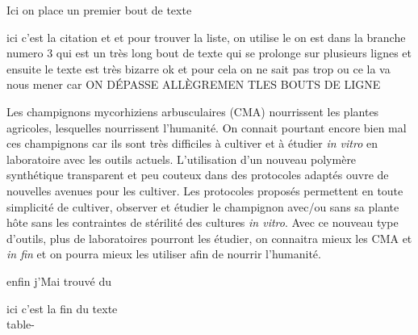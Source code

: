 \documentclass{sn-jnl}%
\begin{document}
	Ici on place un premier bout de texte

 ici c'est la citation \cite{declerck_vitro_2005}et
\cite{fortin_arbuscular_2002}et pour trouver la liste,
\cite{silvani_novel_2019}on utilise le on est dans la branche numero 3 qui est
un très long bout de texte qui se prolonge sur plusieurs lignes et ensuite le
texte est très bizarre ok et pour cela on ne sait pas trop ou ce la va nous
mener car ON DÉPASSE ALLÈGREMEN TLES BOUTS DE LIGNE 



 Les champignons mycorhiziens arbusculaires (CMA) nourrissent les plantes
agricoles, lesquelles nourrissent l'humanité. On connait pourtant encore bien
mal ces champignons car ils sont très difficiles à cultiver et à étudier
\emph{in vitro} en laboratoire avec les outils actuels. L'utilisation d'un
nouveau polymère synthétique transparent et peu couteux dans des protocoles
adaptés ouvre de nouvelles avenues pour les cultiver. Les protocoles proposés
permettent en toute simplicité de cultiver, observer et étudier le champignon
avec/ou sans sa plante hôte sans les contraintes de stérilité des cultures
\textit{in vitro}. Avec ce nouveau type d'outils, plus de laboratoires pourront
les étudier, on connaitra mieux les CMA et \textit{in fin} et on pourra mieux
les utiliser afin de nourrir l'humanité.





enfin j'Mai trouvé du 


	ici c'est la fin du texte\\

	table-
\end{document}
